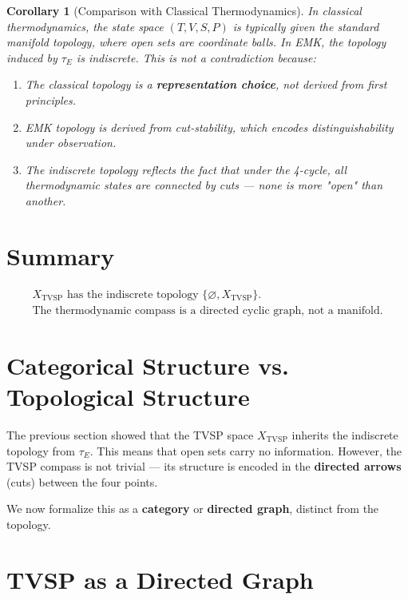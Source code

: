\documentclass[12pt]{article}
\newtheorem{corollary}[axiom]{Corollary}
\begin{document}
\begin{corollary}[Comparison with Classical Thermodynamics]
In classical thermodynamics, the state space \((T, V, S, P)\) is typically given the standard manifold topology, where open sets are coordinate balls.
In EMK, the topology induced by \(\tau_E\) is indiscrete.
This is not a contradiction because:
\begin{enumerate}
    \item The classical topology is a \textbf{representation choice}, not derived from first principles.
    \item EMK topology is derived from cut-stability, which encodes distinguishability under observation.
    \item The indiscrete topology reflects the fact that under the 4-cycle, all thermodynamic states are connected by cuts — none is more "open" than another.
\end{enumerate}
\end{corollary}

\section{Summary}

\[
\boxed{
\begin{array}{c}
X_{\text{TVSP}} \text{ has the indiscrete topology } \{\varnothing, X_{\text{TVSP}}\}. \\
\text{The thermodynamic compass is a directed cyclic graph, not a manifold.}
\end{array}
}
\]

\section{Categorical Structure vs. Topological Structure}

The previous section showed that the TVSP space \(X_{\text{TVSP}}\) inherits the indiscrete topology from \(\tau_E\). This means that open sets carry no information. However, the TVSP compass is not trivial — its structure is encoded in the \textbf{directed arrows} (cuts) between the four points.

We now formalize this as a \textbf{category} or \textbf{directed graph}, distinct from the topology.

\section{TVSP as a Directed Graph}
\end{document}
